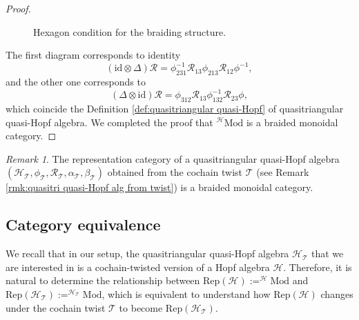 \documentclass[reqno]{amsart}
\theoremstyle{definition}
\theoremstyle{remark}
\newtheorem{remark}[formula]{Remark}
\begin{document}
\begin{proof}
\begin{figure}[ht]
\caption{Hexagon condition for the braiding structure.}
\end{figure}
The first diagram corresponds to identity
\begin{equation}
    (\textrm{id}\otimes \Delta )\mathcal{R}=\phi_{231}^{-1}\mathcal{R}_{13}\phi_{213}\mathcal{R}_{12}\phi^{-1},
\end{equation}
and the other one corresponds to 
\begin{equation}
     (\Delta \otimes \textrm{id})\mathcal{R} = \phi_{312} \mathcal{R}_{13}\phi_{132}^{-1}\mathcal{R}_{23}\phi,
\end{equation}
which coincide the Definition \ref{def:quasitriangular quasi-Hopf} of quasitriangular quasi-Hopf algebra. We completed the proof that $^{\mathscr{H}}\text{Mod}$ is a braided monoidal category.
\end{proof}


\begin{remark}
    The representation category of a quasitriangular quasi-Hopf algebra $\left(\mathscr{H}_\mathcal{T},\phi_\mathcal{T},\mathcal{R}_\mathcal{T},\alpha_\mathcal{T},\beta_\mathcal{T}\right)$ obtained from the cochain twist $\mathcal{T}$ (see Remark \ref{rmk:quasitri quasi-Hopf alg from twist}) is a braided monoidal category.
\end{remark}


\subsection{Category equivalence}
We recall that in our setup, the quasitriangular quasi-Hopf algebra $\mathscr{H}_\mathcal{T}$ that we are interested in is a cochain-twisted version of a Hopf algebra $\mathscr{H}$. Therefore, it is natural to determine the relationship between $\text{Rep}(\mathscr{H}):=^{\mathscr{H}}\text{Mod}$ and $\text{Rep}(\mathscr{H}_\mathcal{T}):=^{\mathscr{H}_\mathcal{T}}\text{Mod}$, which is equivalent to understand how $\text{Rep}(\mathscr{H})$ changes under the cochain twist $\mathcal{T}$ to become $\text{Rep}(\mathscr{H}_\mathcal{T})$. 
\end{document}
